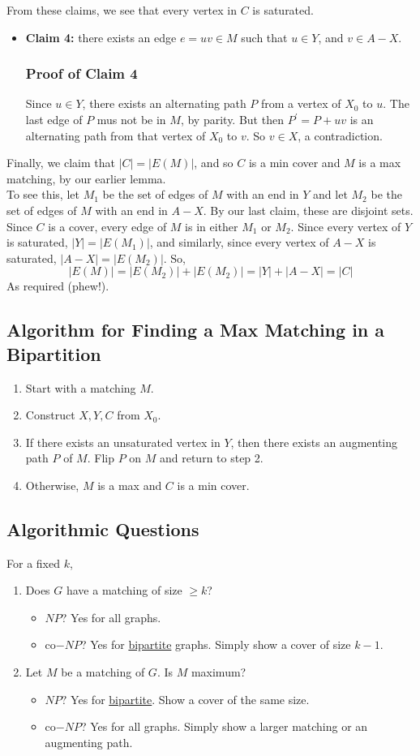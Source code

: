 \documentclass{report}
\begin{document}
From these claims, we see that every vertex in $C$ is saturated.
\begin{itemize}
\item \textbf{Claim 4:} there exists an edge $e = uv \in M$ such that $u \in Y$, and $v \in A-X$.
\subsubsection{Proof of Claim 4}
Since $u \in Y$, there exists an alternating path $P$ from a vertex of $X_0$ to $u$. The last edge of $P$ mus not be in $M$, by parity. But then $P^\prime = P+uv$ is an alternating path from that vertex of $X_0$ to $v$. So $v \in X$, a contradiction.
\end{itemize}
Finally, we claim that $|C| = |E(M)|$, and so $C$ is a min cover and $M$ is a max matching, by our earlier lemma.\\
To see this, let $M_1$ be the set of edges of $M$ with an end in $Y$ and let $M_2$ be the set of edges of $M$ with an end in $A-X$. By our last claim, these are disjoint sets. Since $C$ is a cover, every edge of $M$ is in either $M_1$ or $M_2$. Since every vertex of $Y$ is saturated, $|Y| = |E(M_1)|$, and similarly, since every vertex of $A-X$ is saturated, $|A-X| = |E(M_2)|$. So,
$$|E(M)| = |E(M_2)| + |E(M_2)| = |Y| + |A-X| = |C|$$
As required (phew!).
\subsection{Algorithm for Finding a Max Matching in a Bipartition}
\begin{enumerate}
\item Start with a matching $M$.
\item Construct $X,Y,C$ from $X_0$.
\item If there exists an unsaturated vertex in $Y$, then there exists an augmenting path $P$ of $M$. Flip $P$ on $M$ and return to step 2.
\item Otherwise, $M$ is a max and $C$ is a min cover.
\end{enumerate}
\subsection{Algorithmic Questions}
For a fixed $k$,
\begin{enumerate}
\item Does $G$ have a matching of size $\geq k$?
\begin{itemize}
\item $NP$? Yes for all graphs.
\item co$-NP$? Yes for \underline{bipartite} graphs. Simply show a cover of size $k-1$.
\end{itemize}
\item Let $M$ be a matching of $G$. Is $M$ maximum?
\begin{itemize}
\item $NP?$ Yes for \underline{bipartite}. Show a cover of the same size.
\item co$-NP$? Yes for all graphs. Simply show a larger matching or an augmenting path.
\end{itemize}
\end{enumerate}

\end{document}
